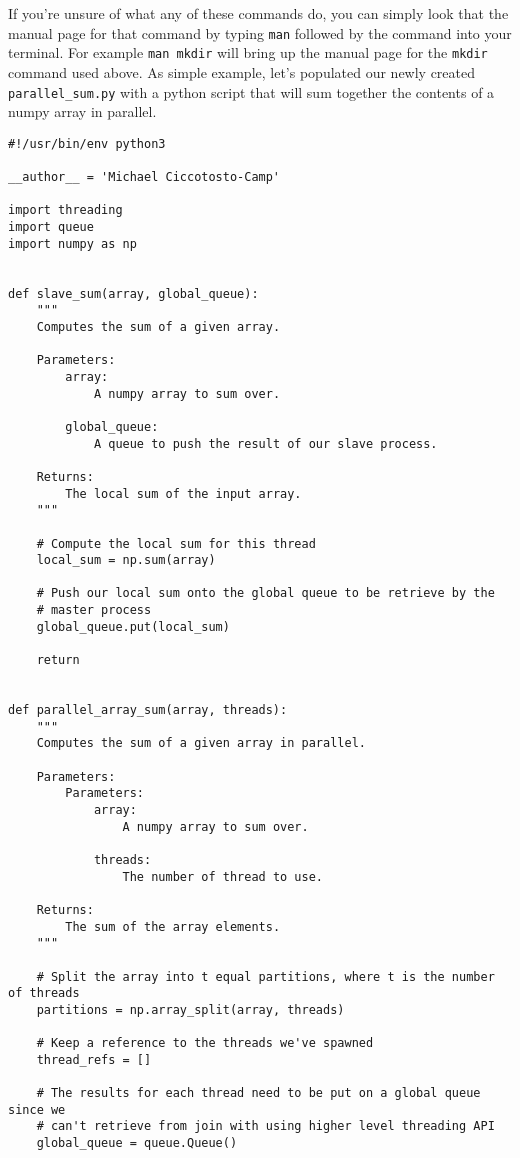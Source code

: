 If you're unsure of what any of these commands do, you can simply look that the manual page for that command by typing \texttt{man} followed by the command into your terminal. For example \texttt{man mkdir} will bring up the manual page for the \texttt{mkdir} command used above. As simple example, let's populated our newly created \texttt{parallel\_sum.py} with a python script that will sum together the contents of a numpy array in parallel.
\begin{verbatim}
#!/usr/bin/env python3

__author__ = 'Michael Ciccotosto-Camp'

import threading
import queue
import numpy as np


def slave_sum(array, global_queue):
    """
    Computes the sum of a given array.

    Parameters:
        array:
            A numpy array to sum over.

        global_queue:
            A queue to push the result of our slave process.

    Returns:
        The local sum of the input array.
    """

    # Compute the local sum for this thread
    local_sum = np.sum(array)

    # Push our local sum onto the global queue to be retrieve by the
    # master process
    global_queue.put(local_sum)

    return


def parallel_array_sum(array, threads):
    """
    Computes the sum of a given array in parallel.

    Parameters:
        Parameters:
            array:
                A numpy array to sum over.

            threads:
                The number of thread to use.

    Returns:
        The sum of the array elements.
    """

    # Split the array into t equal partitions, where t is the number of threads
    partitions = np.array_split(array, threads)

    # Keep a reference to the threads we've spawned
    thread_refs = []

    # The results for each thread need to be put on a global queue since we
    # can't retrieve from join with using higher level threading API
    global_queue = queue.Queue()


\end{verbatim}
